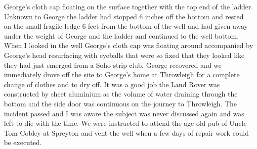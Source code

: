 George's cloth cap floating on the surface together with the top end of the
ladder. Unknown to George the ladder had stopped 6 inches off the bottom and
rested on the small fragile ledge 6 feet from the bottom of the well and had
given away under the weight of George and the ladder and continued to the well
bottom,  When I looked in the well George's cloth cap was floating around
accompanied by George's head resurfacing with eyeballs that were so fixed that
they looked like they had just emerged from a Soho strip club. George
recovered and we immediately drove off the site to George's home at Throwleigh
for a complete change of clothes and to dry off. It was a good job the Land
Rover was constructed by sheet aluminium as the volume of water draining
through the bottom and the side door was continuous on the journey to
Throwleigh. The incident passed and I was aware the subject was never discussed
again and was left to die with the time. We were instructed to attend the age
old pub of Uncle Tom Cobley at Spreyton and vent the well when a few days of
repair work could be executed.
